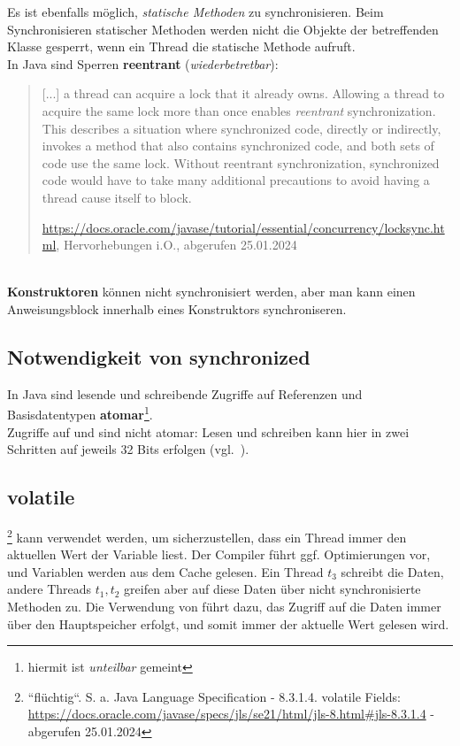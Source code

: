 Es ist ebenfalls möglich, \textit{statische Methoden} zu synchronisieren.
Beim Synchronisieren statischer Methoden werden nicht die Objekte der betreffenden Klasse gesperrt, wenn ein Thread die statische Methode aufruft.\\

In Java sind Sperren \textbf{reentrant} (\textit{wiederbetretbar}):

\blockquote[\url{https://docs.oracle.com/javase/tutorial/essential/concurrency/locksync.html}, Hervorhebungen i.O., abgerufen 25.01.2024]{
     [...] a thread can acquire a lock that it already owns. Allowing a thread to acquire the same lock more than once enables \textit{reentrant} synchronization. This describes a situation where synchronized code, directly or indirectly, invokes a method that also contains synchronized code, and both sets of code use the same lock. Without reentrant synchronization, synchronized code would have to take many additional precautions to avoid having a thread cause itself to block.

}\\

\textbf{Konstruktoren} können nicht synchronisiert werden, aber man kann einen Anweisungsblock innerhalb eines Konstruktors synchroniseren.

\subsection*{Notwendigkeit von synchronized}

In Java sind lesende und schreibende Zugriffe auf Referenzen und Basisdatentypen \textbf{atomar}\footnote{
hiermit ist \textit{unteilbar} gemeint
}.\\

Zugriffe auf  und  sind nicht atomar: Lesen und schreiben kann hier in zwei Schritten auf jeweils 32 Bits erfolgen (vgl.~\cite[30]{Oec22}).\\

\subsection*{volatile}
\footnote{``flüchtig``.
S. a. Java Language Specification - 8.3.1.4. volatile Fields: \url{https://docs.oracle.com/javase/specs/jls/se21/html/jls-8.html#jls-8.3.1.4} - abgerufen 25.01.2024
} kann verwendet werden, um sicherzustellen, dass ein Thread immer den aktuellen Wert der Variable liest.
Der Compiler führt ggf. Optimierungen vor, und Variablen werden aus dem Cache gelesen.
Ein Thread $t_3$ schreibt die Daten, andere Threads $t_1, t_2$ greifen aber auf diese Daten über nicht synchronisierte Methoden zu.
Die Verwendung von  führt dazu, das Zugriff auf die Daten immer über den Hauptspeicher erfolgt, und somit immer der aktuelle Wert gelesen wird.

